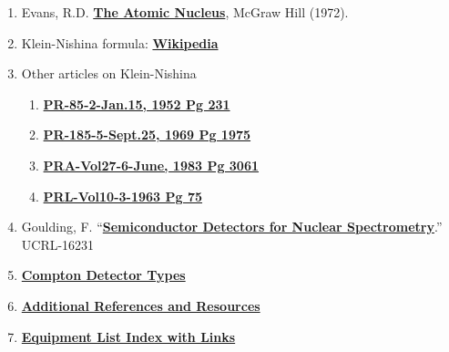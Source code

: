 \documentclass{../lab}
\begin{document}
\begin{enumerate}
\begin{enumerate}
        \end{enumerate}
    
    \item Evans, R.D. \href{https://drive.google.com/file/d/1dHgK8gXV5EruHZoahXIMxdXk2cJ6jTod/view?usp=drive_link}{\textbf{The Atomic Nucleus}}, McGraw Hill (1972).

    \item Klein-Nishina formula: \href{https://drive.google.com/file/d/1kOcblFVHRqHCpxo53VzigYMENB9rx7LA/view?usp=drive_link}{\textbf{Wikipedia}}

    \item Other articles on Klein-Nishina
    \begin{enumerate}
    
        \item \href{https://drive.google.com/file/d/1uoTHRACFor6OV3KnMrAeHQKq6ZpvtUvU/view?usp=drive_link}
        {\textbf{PR-85-2-Jan.15, 1952 Pg 231}}
        
        \item \href{https://drive.google.com/file/d/1y93jqyOfZfCiU7l06BN556njTOCyyG_U/view?usp=drive_link}
        {\textbf{PR-185-5-Sept.25, 1969 Pg 1975}}
        
        \item \href{https://drive.google.com/file/d/1whyf5YlpxXUadgmUA6rsyQaK_vq-BTcu/view?usp=drive_link}
        {\textbf{PRA-Vol27-6-June, 1983 Pg 3061}}
        
        \item \href{https://drive.google.com/file/d/1LGUPznLWHPeN0dEQtbBnoZFPg6-ZFi3z/view?usp=drive_link}
        {\textbf{PRL-Vol10-3-1963 Pg 75}}
        
    \end{enumerate} 

    \item Goulding, F. ``\href{https://drive.google.com/file/d/1AGCnAptzwBlvi62IqV_VkTrztqrj67Dy/view?usp=drive_link}{\textbf{Semiconductor Detectors for Nuclear Spectrometry}}.'' UCRL-16231

    \item
    \href{https://drive.google.com/file/d/1TRLm4KLJM7AE4-tf3LXSB6xkwv_x--l8/view?usp=drive_link}
    {\textbf{Compton Detector Types}}

    \item    \href{https://drive.google.com/file/d/19KtGoG2QKnCCeXiECVbwllBf4pRcJhtt/view?usp=drive_link}
    {\textbf{Additional References and Resources}}

    \item    \href{https://drive.google.com/file/d/1PCQGxtrVpt0d187YUJZaNNhCBs8ic0eE/view?usp=drive_link}
    {\textbf{Equipment List Index with Links}}

\end{enumerate}
\end{document}

